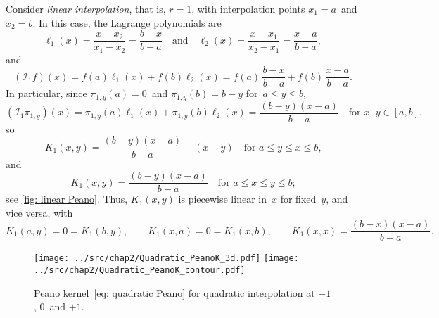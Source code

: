 \begin{example}\label{example: linear interp}
Consider \emph{linear interpolation}, that is, $r=1$, with interpolation points 
$x_1=a$~and $x_2=b$.  In this case, the Lagrange polynomials are
\[
\ell_1(x)=\frac{x-x_2}{x_1-x_2}=\frac{b-x}{b-a}
\quad\text{and}\quad
\ell_2(x)=\frac{x-x_1}{x_2-x_1}=\frac{x-a}{b-a},
\]
and
\[
(\mathcal{I}_1f)(x)=f(a)\ell_1(x)+f(b)\ell_2(x)
	=f(a)\,\frac{b-x}{b-a}+f(b)\,\frac{x-a}{b-a}.
\]
In particular, since $\pi_{1,y}(a)=0$~and $\pi_{1,y}(b)=b-y$ for~$a\le y\le b$,
\[
(\mathcal{I}_1\pi_{1,y})(x)=\pi_{1,y}(a)\ell_1(x)+\pi_{1,y}(b)\ell_2(x)
	=\frac{(b-y)(x-a)}{b-a}\quad\text{for $x$, $y\in[a,b]$,}
\]
so
\[
K_1(x,y)=\frac{(b-y)(x-a)}{b-a}-(x-y)\quad\text{for $a\le y\le x\le b$,}
\]
and
\[
K_1(x,y)=\frac{(b-y)(x-a)}{b-a}\quad\text{for $a\le x\le y\le b$;}
\]
see \cref{fig: linear Peano}. Thus, $K_1(x,y)$ is piecewise linear in~$x$ for
fixed~$y$, and vice versa, with
\[
K_1(a,y)=0=K_1(b,y),\qquad K_1(x,a)=0=K_1(x,b),\qquad
K_1(x,x)=\frac{(b-x)(x-a)}{b-a}.
\]
\end{example}

\begin{figure}
\caption{Peano kernel~\eqref{eq: quadratic Peano} for quadratic interpolation 
at $-1$, $0$~and $+1$.}\label{fig: quadratic Peano}
\begin{center}
\texttt{[image: ../src/chap2/Quadratic\_PeanoK\_3d.pdf]}
\texttt{[image: ../src/chap2/Quadratic\_PeanoK\_contour.pdf]}
\end{center}
\end{figure}


